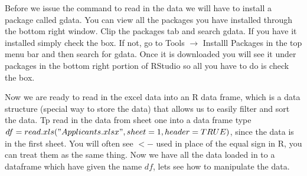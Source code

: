 \documentclass[11pt]{article}
\begin{document}
Before we issue the command to read in the data we will have to install a package called gdata. You can view all the packages you have installed through the bottom right window.  Clip the packages tab and search gdata.  If you have it installed simply check the box. If not, go to Tools $\rightarrow$ Installl Packages in the top menu bar and then search for gdata.  Once it is downloaded you will see it under packages in the bottom right portion of RStudio so all you have to do is check the box. 

Now we are ready to read in the excel data into an R data frame, which is a data structure (special way to store the data) that allows us to easily filter and sort the data.  Tp read in the data from sheet one into a data frame type $ df = read.xls ("Applicants.xlsx", sheet = 1, header = TRUE)$, since the data is in the first sheet.  You will often see $<-$ used in place of the equal sign in R, you can treat them as the same thing.  Now we have all the data loaded in to a dataframe which have given the name $df$, lets see how to manipulate the data.

\end{document}
